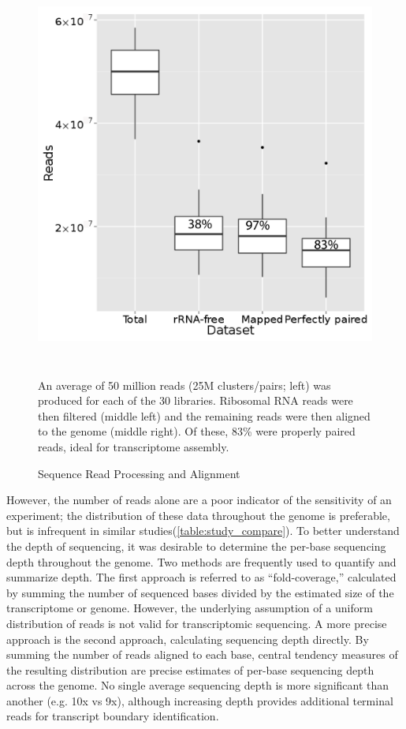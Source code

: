 \begin{figure}
\small
\includegraphics[width=\textwidth,height=5in]{images/Sequencing/Alignment_reads.png}
\caption{Sequence Read Processing and Alignment}\label{fig:4.4}
An average of 50 million reads (25M clusters/pairs; left) was produced for each of the 30 libraries. Ribosomal RNA reads were then filtered (middle left) and the remaining reads were then aligned to the genome (middle right). Of these, 83\% were properly paired reads, ideal for transcriptome assembly.
\end{figure}

However, the number of reads alone are a poor indicator of the sensitivity of an experiment; the distribution of these data throughout the genome is preferable, but is infrequent in similar studies(\ref{table:study_compare}). To better understand the depth of sequencing, it was desirable to determine the per-base sequencing depth throughout the genome. Two methods are frequently used to quantify and summarize depth. The first approach is referred to as ``fold-coverage,'' calculated by summing the number of sequenced bases divided by the estimated size of the transcriptome or genome. However, the underlying assumption of a uniform distribution of reads is not valid for transcriptomic sequencing. A more precise approach is the second approach, calculating sequencing depth directly. By summing the number of reads aligned to each base, central tendency measures of the resulting distribution are precise estimates of per-base sequencing depth across the genome. No single average sequencing depth is more significant than another (e.g. 10x vs 9x), although increasing depth provides additional terminal reads for transcript boundary identification. 

